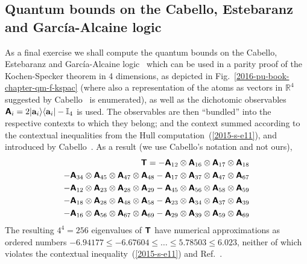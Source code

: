 \documentclass[%
  twocolumn,
 showpacs,
 showkeys,
 preprintnumbers,
 amsmath,amssymb,
 aps,
  pra,
  longbibliography,
 floatfix,
 ]{revtex4-1}
\begin{document}
\subsection{Quantum bounds on the Cabello, Estebaranz and Garc{\'{i}}a-Alcaine logic}

As a final exercise we shall compute the quantum bounds on the Cabello, Estebaranz and Garc{\'{i}}a-Alcaine logic~\cite{cabello-96,cabello-99}
which can be used in a parity proof of the Kochen-Specker theorem in 4 dimensions,
as depicted in Fig.~\ref{2016-pu-book-chapter-qm-f-kspac} (where also a
representation of the atoms as  vectors in $\mathbb{R}^4$
suggested by Cabello~\cite[Fig.~1]{cabello:210401} is enumerated),
as well as  the dichotomic observables~\cite[Eq.~(2)]{cabello:210401}
$\textsf{\textbf{A}}_i = 2 \vert {\bf a}_i \rangle \langle {\bf a}_i \vert - \mathbb{I}_4$ is used.
The observables are then ``bundled'' into the respective contexts to which they belong; and the context summed
according to the contextual inequalities from the Hull computation~(\ref{2015-s-e11}), and
introduced by Cabello~\cite[Eq.~(1)]{cabello:210401}.
As a result (we use Cabello's notation and not ours),
\begin{equation}
\begin{split}
\textsf{\textbf{T}}=-   \textsf{\textbf{A}}_{12} \otimes  \textsf{\textbf{A}}_{16} \otimes  \textsf{\textbf{A}}_{17} \otimes   \textsf{\textbf{A}}_{18}    \\
   -   \textsf{\textbf{A}}_{34} \otimes  \textsf{\textbf{A}}_{45} \otimes  \textsf{\textbf{A}}_{47} \otimes   \textsf{\textbf{A}}_{48}
   -   \textsf{\textbf{A}}_{17} \otimes  \textsf{\textbf{A}}_{37} \otimes  \textsf{\textbf{A}}_{47} \otimes   \textsf{\textbf{A}}_{67}                      \\
   -   \textsf{\textbf{A}}_{12} \otimes  \textsf{\textbf{A}}_{23} \otimes  \textsf{\textbf{A}}_{28} \otimes   \textsf{\textbf{A}}_{29}
   -   \textsf{\textbf{A}}_{45} \otimes  \textsf{\textbf{A}}_{56} \otimes  \textsf{\textbf{A}}_{58} \otimes   \textsf{\textbf{A}}_{59}                     \\
   -   \textsf{\textbf{A}}_{18} \otimes  \textsf{\textbf{A}}_{28} \otimes  \textsf{\textbf{A}}_{48} \otimes   \textsf{\textbf{A}}_{58}
   -   \textsf{\textbf{A}}_{23} \otimes  \textsf{\textbf{A}}_{34} \otimes  \textsf{\textbf{A}}_{37} \otimes   \textsf{\textbf{A}}_{39}                     \\
   -   \textsf{\textbf{A}}_{16} \otimes  \textsf{\textbf{A}}_{56} \otimes  \textsf{\textbf{A}}_{67} \otimes   \textsf{\textbf{A}}_{69}
   -   \textsf{\textbf{A}}_{29} \otimes  \textsf{\textbf{A}}_{39} \otimes  \textsf{\textbf{A}}_{59} \otimes   \textsf{\textbf{A}}_{69}
\end{split}
\label{e-2017-b-whatever-e7cabnc}
\end{equation}
The resulting $4^4=256$ eigenvalues of $\textsf{\textbf{T}}$
have numerical approximations as ordered numbers
$ -6.94177 \le  -6.67604\le   \ldots \le  5.78503\le  6.023$,
neither of which violates the contextual inequality~(\ref{2015-s-e11}) and Ref.~\cite[Eq.~(1)]{cabello:210401}.
\end{document}
